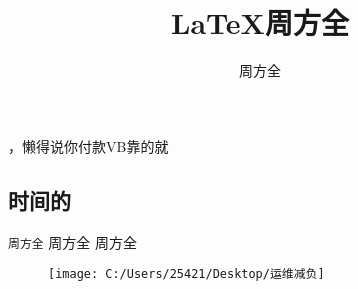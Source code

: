 \documentclass[]{article}
\title{\LaTeX 周方全}
\author{周方全}
\begin{document}
\maketitle

\begin{abstract}

\end{abstract}

\section{}
，懒得说你付款VB靠的就

\subsection{时间的}
\texttt{周方全}
\textsc{周方全}
\textsf{周方全}

\begin{figure}[htbp]
	\centering
	\texttt{[image: C:/Users/25421/Desktop/运维减负]}
	\caption{}
	\label{fig:}
\end{figure}
\end{document}
